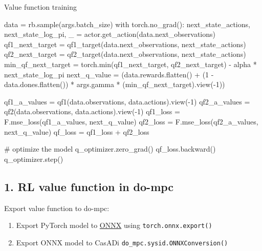 \documentclass[
  letterpaper,
  DIV=11,
  numbers=noendperiod,
  oneside]{scrartcl}
\newenvironment{Shaded}{\begin{snugshade}}{\end{snugshade}}
\newcommand{\BuiltInTok}[1]{\textcolor[rgb]{0.00,0.23,0.31}{#1}}
\newcommand{\CommentTok}[1]{\textcolor[rgb]{0.37,0.37,0.37}{#1}}
\newcommand{\ControlFlowTok}[1]{\textcolor[rgb]{0.00,0.23,0.31}{#1}}
\newcommand{\DecValTok}[1]{\textcolor[rgb]{0.68,0.00,0.00}{#1}}
\newcommand{\NormalTok}[1]{\textcolor[rgb]{0.00,0.23,0.31}{#1}}
\newcommand{\OperatorTok}[1]{\textcolor[rgb]{0.37,0.37,0.37}{#1}}
\providecommand{\tightlist}{%
  \setlength{\itemsep}{0pt}\setlength{\parskip}{0pt}}\usepackage{longtable,booktabs,array}
\begin{document}
Value function training

\begin{Shaded}
\begin{Highlighting}[numbers=left,,]
\NormalTok{data }\OperatorTok{=}\NormalTok{ rb.sample(args.batch\_size)}
\ControlFlowTok{with}\NormalTok{ torch.no\_grad():}
\NormalTok{    next\_state\_actions, next\_state\_log\_pi, \_ }\OperatorTok{=}\NormalTok{ actor.get\_action(data.next\_observations)}
\NormalTok{    qf1\_next\_target }\OperatorTok{=}\NormalTok{ qf1\_target(data.next\_observations, next\_state\_actions)}
\NormalTok{    qf2\_next\_target }\OperatorTok{=}\NormalTok{ qf2\_target(data.next\_observations, next\_state\_actions)}
\NormalTok{    min\_qf\_next\_target }\OperatorTok{=}\NormalTok{ torch.}\BuiltInTok{min}\NormalTok{(qf1\_next\_target, qf2\_next\_target) }\OperatorTok{{-}}\NormalTok{ alpha }\OperatorTok{*}\NormalTok{ next\_state\_log\_pi}
\NormalTok{    next\_q\_value }\OperatorTok{=}\NormalTok{ (data.rewards.flatten() }\OperatorTok{+} 
\NormalTok{        (}\DecValTok{1} \OperatorTok{{-}}\NormalTok{ data.dones.flatten()) }\OperatorTok{*}\NormalTok{ args.gamma }\OperatorTok{*}\NormalTok{ (min\_qf\_next\_target).view(}\OperatorTok{{-}}\DecValTok{1}\NormalTok{))}

\NormalTok{qf1\_a\_values }\OperatorTok{=}\NormalTok{ qf1(data.observations, data.actions).view(}\OperatorTok{{-}}\DecValTok{1}\NormalTok{)}
\NormalTok{qf2\_a\_values }\OperatorTok{=}\NormalTok{ qf2(data.observations, data.actions).view(}\OperatorTok{{-}}\DecValTok{1}\NormalTok{)}
\NormalTok{qf1\_loss }\OperatorTok{=}\NormalTok{ F.mse\_loss(qf1\_a\_values, next\_q\_value)}
\NormalTok{qf2\_loss }\OperatorTok{=}\NormalTok{ F.mse\_loss(qf2\_a\_values, next\_q\_value)}
\NormalTok{qf\_loss }\OperatorTok{=}\NormalTok{ qf1\_loss }\OperatorTok{+}\NormalTok{ qf2\_loss}

\CommentTok{\# optimize the model}
\NormalTok{q\_optimizer.zero\_grad()}
\NormalTok{qf\_loss.backward()}
\NormalTok{q\_optimizer.step()}
\end{Highlighting}
\end{Shaded}

\subsection{1. RL value function in
do-mpc}\label{rl-value-function-in-do-mpc-1}

Export value function to do-mpc:

\begin{enumerate}
\def\labelenumi{\arabic{enumi}.}
\tightlist
\item
  Export PyTorch model to \href{https://onnx.ai}{ONNX} using
  \texttt{torch.onnx.export()}
\item
  Export ONNX model to CasADi \texttt{do\_mpc.sysid.ONNXConversion()}
\end{enumerate}
\end{document}
